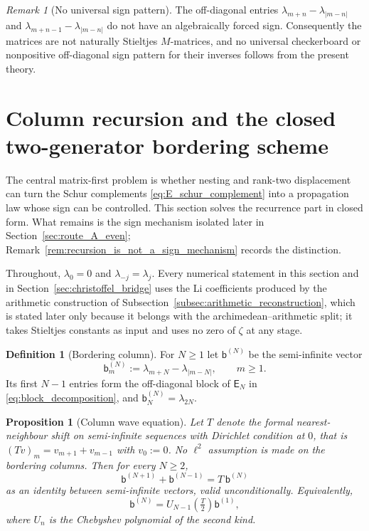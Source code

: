 \documentclass[11pt]{amsart}
\numberwithin{equation}{section}
\theoremstyle{plain}
\newtheorem{proposition}[theorem]{Proposition}
\theoremstyle{definition}
\newtheorem{definition}[theorem]{Definition}
\theoremstyle{remark}
\newtheorem{remark}[theorem]{Remark}
\newcommand{\E}{\mathsf E}
\begin{document}
\begin{remark}[No universal sign pattern]
\label{rem:no_M_matrix}
The off-diagonal entries $\lambda_{m+n}-\lambda_{|m-n|}$ and $\lambda_{m+n-1}-\lambda_{|m-n|}$ do not have an algebraically forced sign. Consequently the matrices are not naturally Stieltjes $M$-matrices, and no universal checkerboard or nonpositive off-diagonal sign pattern for their inverses follows from the present theory.
\end{remark}


\section{Column recursion and the closed two-generator bordering scheme}
\label{sec:two_generator}

The central matrix-first problem is whether nesting and rank-two displacement can turn the
Schur complements \eqref{eq:E_schur_complement} into a propagation law whose sign can be
controlled.  This section solves the recurrence part in closed form.  What remains is the
sign mechanism isolated later in Section~\ref{sec:route_A_even};
Remark~\ref{rem:recursion_is_not_a_sign_mechanism} records the distinction.

Throughout, $\lambda_0=0$ and $\lambda_{-j}=\lambda_j$.  Every numerical statement in this section and in Section~\ref{sec:christoffel_bridge} uses the Li coefficients produced by the arithmetic construction of Subsection~\ref{subsec:arithmetic_reconstruction}, which is stated later only because it belongs with the archimedean--arithmetic split; it takes Stieltjes constants as input and uses no zero of $\zeta$ at any stage.

\begin{definition}[Bordering column]
\label{def:bordering_column}
For $N\ge1$ let $\mathsf b^{(N)}$ be the semi-infinite vector
\begin{equation}
 \mathsf b^{(N)}_m:=\lambda_{m+N}-\lambda_{|m-N|},
 \qquad m\ge1 .
 \label{eq:bordering_column}
\end{equation}
Its first $N-1$ entries form the off-diagonal block of $\E_N$ in
\eqref{eq:block_decomposition}, and $\mathsf b^{(N)}_N=\lambda_{2N}$.
\end{definition}

\begin{proposition}[Column wave equation]
\label{prop:column_wave_equation}
Let $T$ denote the formal nearest-neighbour shift on semi-infinite sequences with Dirichlet
condition at $0$, that is $(Tv)_m=v_{m+1}+v_{m-1}$ with $v_0:=0$.  No $\ell^2$ assumption is
made on the bordering columns.  Then for every $N\ge2$,
\begin{equation}
 \boxed{\;
 \mathsf b^{(N+1)}+\mathsf b^{(N-1)}=T\,\mathsf b^{(N)} \;}
 \label{eq:column_wave_equation}
\end{equation}
as an identity between semi-infinite vectors, valid unconditionally.  Equivalently,
\begin{equation}
 \mathsf b^{(N)}=U_{N-1}\!\left(\tfrac{T}{2}\right)\mathsf b^{(1)},
 \label{eq:column_chebyshev}
\end{equation}
where $U_n$ is the Chebyshev polynomial of the second kind.
\end{proposition}
\end{document}
